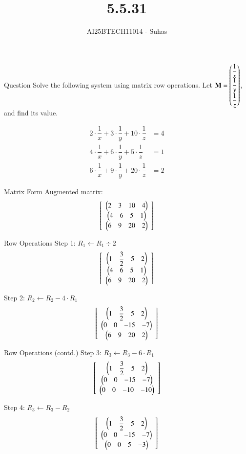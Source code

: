 \documentclass{beamer}
\title{5.5.31}
\author{AI25BTECH11014 - Suhas}
\begin{document}
\frame{\titlepage}

\begin{frame}{Question}
Solve the following system using matrix row operations.  
Let \( \mathbf{M} = \begin{pmatrix}\dfrac{1}{x} \\ \dfrac{1}{y} \\ \dfrac{1}{z}\end{pmatrix} \), and find its value.

\[
\begin{aligned}
2 \cdot \dfrac{1}{x} + 3 \cdot \dfrac{1}{y} + 10 \cdot \dfrac{1}{z} &= 4 \\
4 \cdot \dfrac{1}{x} + 6 \cdot \dfrac{1}{y} + 5 \cdot \dfrac{1}{z} &= 1 \\
6 \cdot \dfrac{1}{x} + 9 \cdot \dfrac{1}{y} + 20 \cdot \dfrac{1}{z} &= 2
\end{aligned}
\]
\end{frame}

\begin{frame}{Matrix Form}
Augmented matrix:
\[
\left[
\begin{array}{c}
\begin{pmatrix}2 & 3 & 10 & 4\end{pmatrix} \\
\begin{pmatrix}4 & 6 & 5 & 1\end{pmatrix} \\
\begin{pmatrix}6 & 9 & 20 & 2\end{pmatrix}
\end{array}
\right]
\]
\end{frame}

\begin{frame}{Row Operations}
Step 1: \( R_1 \leftarrow R_1 \div 2 \)
\[
\left[
\begin{array}{c}
\begin{pmatrix}1 & \dfrac{3}{2} & 5 & 2\end{pmatrix} \\
\begin{pmatrix}4 & 6 & 5 & 1\end{pmatrix} \\
\begin{pmatrix}6 & 9 & 20 & 2\end{pmatrix}
\end{array}
\right]
\]

Step 2: \( R_2 \leftarrow R_2 - 4 \cdot R_1 \)
\[
\left[
\begin{array}{c}
\begin{pmatrix}1 & \dfrac{3}{2} & 5 & 2\end{pmatrix} \\
\begin{pmatrix}0 & 0 & -15 & -7\end{pmatrix} \\
\begin{pmatrix}6 & 9 & 20 & 2\end{pmatrix}
\end{array}
\right]
\]
\end{frame}

\begin{frame}{Row Operations (contd.)}
Step 3: \( R_3 \leftarrow R_3 - 6 \cdot R_1 \)
\[
\left[
\begin{array}{c}
\begin{pmatrix}1 & \dfrac{3}{2} & 5 & 2\end{pmatrix} \\
\begin{pmatrix}0 & 0 & -15 & -7\end{pmatrix} \\
\begin{pmatrix}0 & 0 & -10 & -10\end{pmatrix}
\end{array}
\right]
\]

Step 4: \( R_3 \leftarrow R_3 - R_2 \)
\[
\left[
\begin{array}{c}
\begin{pmatrix}1 & \dfrac{3}{2} & 5 & 2\end{pmatrix} \\
\begin{pmatrix}0 & 0 & -15 & -7\end{pmatrix} \\
\begin{pmatrix}0 & 0 & 5 & -3\end{pmatrix}
\end{array}
\right]
\]
\end{frame}
\end{document}
